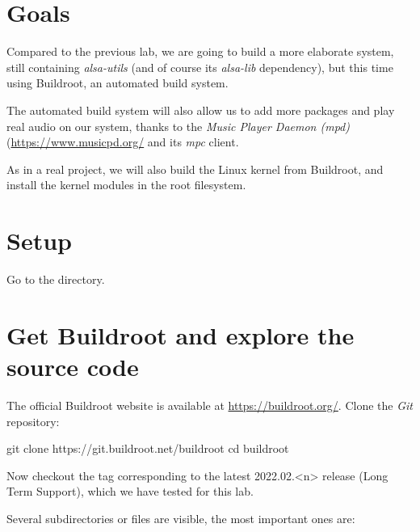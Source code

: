 
\section{Goals}

Compared to the previous lab, we are going to build a more elaborate
system, still containing {\em alsa-utils} (and of course its {\em
alsa-lib} dependency), but this time using Buildroot,
an automated build system.

The automated build system will also allow us to add more packages
and play real audio on our system, thanks to the {\em Music Player
Daemon (mpd)} (\url{https://www.musicpd.org/} and its {\em mpc} client.

As in a real project, we will also build the Linux kernel from
Buildroot, and install the kernel modules in the root filesystem.

\section{Setup}

Go to the  directory.

\section{Get Buildroot and explore the source code}

The official Buildroot website is available at
\url{https://buildroot.org/}. Clone the {\em Git} repository:

\begin{bashinput}
git clone https://git.buildroot.net/buildroot
cd buildroot
\end{bashinput}

Now checkout the tag corresponding to the latest 2022.02.<n> release (Long
Term Support), which we have tested for this lab.

Several subdirectories or files are visible, the most important ones
are:

